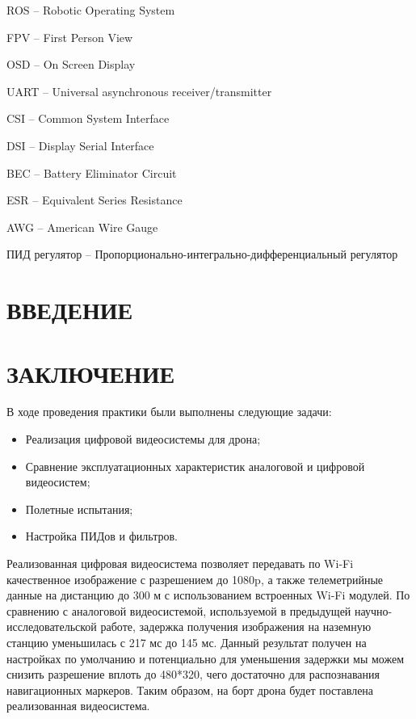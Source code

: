 \documentclass[a4paper,12pt]{article}
\begin{document}
ROS -- Robotic Operating System

FPV -- First Person View

OSD -- On Screen Display

UART -- Universal asynchronous receiver/transmitter

CSI -- Common System Interface

DSI -- Display Serial Interface

BEC -- Battery Eliminator Circuit

ESR -- Equivalent Series Resistance

AWG -- American Wire Gauge

ПИД регулятор -- Пропорционально-интегрально-дифференциальный регулятор

\pagebreak
\thispagestyle{empty}

\tableofcontents
\thispagestyle{empty}
\pagebreak

\section*{\centering ВВЕДЕНИЕ}
\setcounter{page}{3}
\pagebreak
\pagebreak
\pagebreak
\pagebreak
\pagebreak

\section*{\centering ЗАКЛЮЧЕНИЕ}
В ходе проведения практики были выполнены следующие задачи:
\begin{itemize} 
	\item Реализация цифровой видеосистемы для дрона;
	\item Сравнение эксплуатационных характеристик аналоговой и цифровой видеосистем;
	\item Полетные испытания;
	\item Настройка ПИДов и фильтров.
\end{itemize}

Реализованная цифровая видеосистема позволяет передавать по Wi-Fi качественное изображение с разрешением до 1080p, а также телеметрийные данные на дистанцию до 300 м с использованием встроенных Wi-Fi модулей. По сравнению с аналоговой видеосистемой, используемой в предыдущей научно-исследовательской работе, задержка получения изображения на наземную станцию уменьшилась с 217 мс до 145 мс. Данный результат получен на настройках по умолчанию и потенциально для уменьшения задержки мы можем снизить разрешение вплоть до 480*320, чего достаточно для распознавания навигационных маркеров. Таким образом, на борт дрона будет поставлена реализованная видеосистема.
\end{document}
